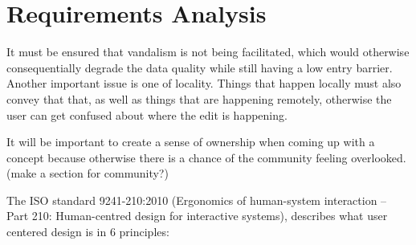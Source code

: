 \section{Requirements Analysis}
It must be ensured that vandalism is not being facilitated, which would otherwise consequentially degrade the data quality while still having a low entry barrier.
Another important issue is one of locality. Things that happen locally must also convey that that, as well as things that are happening remotely, otherwise the user can get confused about where the edit is happening. 

It will be important to create a sense of ownership when coming up with a concept because otherwise there is a chance of the community feeling overlooked. (make a section for community?)

The ISO standard 9241-210:2010 (Ergonomics of human-system interaction -- Part 210: Human-centred design for interactive systems), describes what user centered design is in 6 principles:




\clearpage %